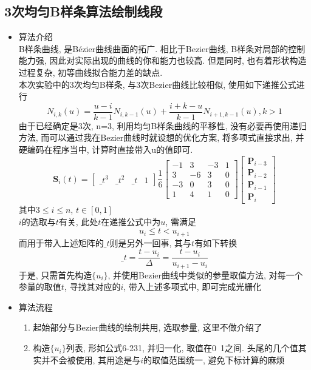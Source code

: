 \documentclass[a4paper,UTF8]{article}
\theoremstyle{definition}
\begin{document}
\subsection{3次均匀B样条算法绘制线段}
\begin{itemize}
  \item 算法介绍\\
  B样条曲线, 是Bézier曲线曲面的拓广. 相比于Bezier曲线, B样条对局部的控制能力强, 因此对实际出现的曲线的你和能力也较高. 但是同时, 也有着形状构造过程复杂, 初等曲线拟合能力差的缺点. \\
  本次实验中的3次均匀B样条, 与3次Bezier曲线比较相似, 使用如下递推公式进行
  $$N_{i,k}(u)=\frac{u-i}{k-1}N_{i,k-1}(u) + \frac{i+k-u}{k-1}N_{i+1,k-1}(u), k>1$$
  由于已经确定是3次, n=3, 利用均匀B样条曲线的平移性, 没有必要再使用递归方法, 而可以通过我在Bezier曲线时就设想的优化方案, 将多项式直接求出, 并硬编码在程序当中, 计算时直接带入u的值即可.\cite{cod_2006}\\
  $$\mathbf{S}_i(t) = \begin{bmatrix} \_t^3 & \_t^2 & \_t & 1 \end{bmatrix} \frac{1}{6} \begin{bmatrix} -1 &  3 & -3 & 1 \\  3 & -6 &  3 & 0 \\ -3 &  0 &  3 & 0 \\  1 &  4 &  1 & 0 \end{bmatrix} \begin{bmatrix} \mathbf{P}_{i-3} \\ \mathbf{P}_{i-2} \\ \mathbf{P}_{i-1} \\ \mathbf{P}_{i} \end{bmatrix}$$
  其中$3\leq i \leq n$, $t\in [0,1]$\\
  $i$的选取与$t$有关, 此处$t$在递推公式中为$u$, 需满足
  $$u_{i}\leq t <u_{i+1}$$
  而用于带入上述矩阵的$\_t$则是另外一回事, 其与$t$有如下转换
  $$\_t=\frac{t-u_i}{\Delta}=\frac{t-u_i}{u_{i+1}-u_i}$$
  于是, 只需首先构造$\{u_i\}$, 并使用Bezier曲线中类似的参量取值方法, 对每一个参量的取值$t$, 寻找其对应的$i$, 带入上述多项式中, 即可完成光栅化
  \item 算法流程
  \begin{enumerate}
    \item 起始部分与Bezier曲线的绘制共用, 选取参量, 这里不做介绍了
    \item 构造$\{u_i\}$列表, 形如公式6-231\cite{sun_2006}, 并归一化, 取值在0~1之间. 头尾的几个值其实并不会被使用, 其用途是与$i$的取值范围统一, 避免下标计算的麻烦

\end{enumerate}
\end{itemize}
\end{document}
